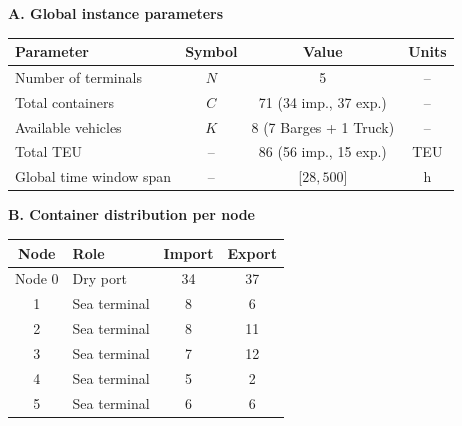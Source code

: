 \begin{table}[htbp]
\centering

\textbf{A. Global instance parameters}

\vspace{0.3em}

\begin{tabular}{l c c c}
\hline
Parameter & Symbol & Value & Units \\
\hline
Number of terminals & $N$ & 5 & -- \\
Total containers & $C$ & 71 (34 imp., 37 exp.) & -- \\
Available vehicles & $K$ & 8 (7 Barges + 1 Truck) & -- \\
Total TEU & -- & 86 (56 imp., 15 exp.) & TEU \\
Global time window span & -- & [$28, 500$] & h \\
\hline
\end{tabular}

\vspace{0.8em}

\textbf{B. Container distribution per node}

\vspace{0.3em}

\begin{tabular}{c l c c}
\hline
Node & Role & Import & Export \\
\hline
Node 0 & Dry port & 34 & 37 \\
1 & Sea terminal & 8 & 6 \\
2 & Sea terminal & 8 & 11 \\
3 & Sea terminal & 7 & 12 \\
4 & Sea terminal & 5 & 2 \\
5 & Sea terminal & 6 & 6 \\
\hline
\end{tabular}

\end{table}
